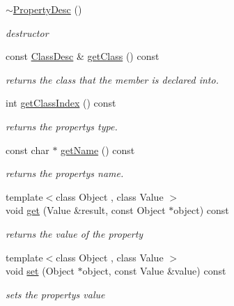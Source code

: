 \begin{DoxyCompactItemize}
\item 
\hyperlink{classagm_1_1reflection_1_1_property_desc_a18a7c3e57cad5d8f4b27f45844507917}{$\sim$\+Property\+Desc} ()\hypertarget{classagm_1_1reflection_1_1_property_desc_a18a7c3e57cad5d8f4b27f45844507917}{}\label{classagm_1_1reflection_1_1_property_desc_a18a7c3e57cad5d8f4b27f45844507917}

\begin{DoxyCompactList}\small\item\em destructor \end{DoxyCompactList}\item 
const \hyperlink{classagm_1_1reflection_1_1_class_desc}{Class\+Desc} \& \hyperlink{classagm_1_1reflection_1_1_property_desc_ab2ff1ec704c1829923bef22922ed0b48}{get\+Class} () const 
\begin{DoxyCompactList}\small\item\em returns the class that the member is declared into. \end{DoxyCompactList}\item 
int \hyperlink{classagm_1_1reflection_1_1_property_desc_a60cbb96f310c7451ffa40506df9b7f85}{get\+Class\+Index} () const 
\begin{DoxyCompactList}\small\item\em returns the property\textquotesingle{}s type. \end{DoxyCompactList}\item 
const char $\ast$ \hyperlink{classagm_1_1reflection_1_1_property_desc_a7dde8343b63b7ef45dfbfc13b0619c6e}{get\+Name} () const 
\begin{DoxyCompactList}\small\item\em returns the property\textquotesingle{}s name. \end{DoxyCompactList}\item 
{\footnotesize template$<$class Object , class Value $>$ }\\void \hyperlink{classagm_1_1reflection_1_1_property_desc_a3928087de7378bf00e83a5f9987423d6}{get} (Value \&result, const Object $\ast$object) const 
\begin{DoxyCompactList}\small\item\em returns the value of the property \end{DoxyCompactList}\item 
{\footnotesize template$<$class Object , class Value $>$ }\\void \hyperlink{classagm_1_1reflection_1_1_property_desc_afcc0d7574d11ab2145ff089803901fce}{set} (Object $\ast$object, const Value \&value) const 
\begin{DoxyCompactList}\small\item\em sets the property\textquotesingle{}s value \end{DoxyCompactList}\end{DoxyCompactItemize}

